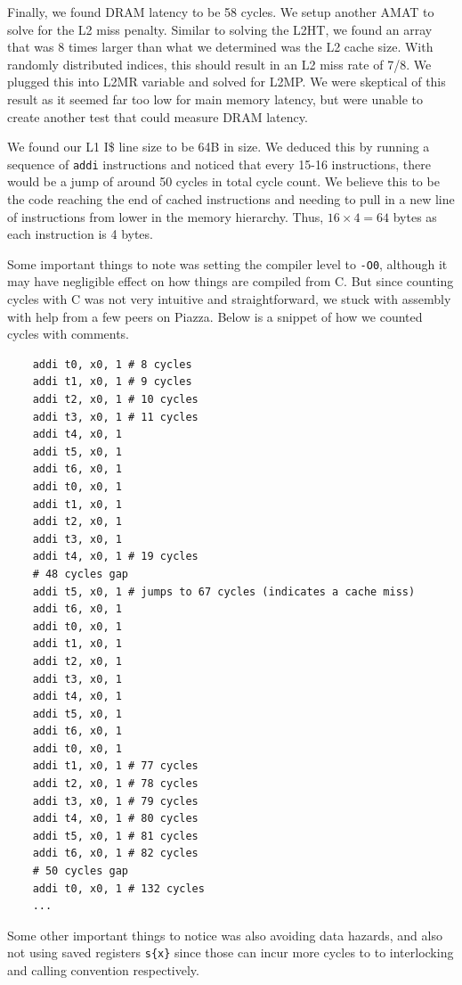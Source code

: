 \documentclass[11pt]{article}
\begin{document}
Finally, we found DRAM latency to be 58 cycles. We setup another AMAT to solve for the L2 miss penalty. Similar to solving the L2HT, we found an array that was 8 times larger than what we determined was the L2 cache size. With randomly distributed indices, this should result in an L2 miss rate of 7/8. We plugged this into L2MR variable and solved for L2MP. We were skeptical of this result as it seemed far too low for main memory latency, but were unable to create another test that could measure DRAM latency. \bigbreak

We found our L1 I\$ line size to be 64B in size. We deduced this by running a sequence of \texttt{addi} instructions and noticed that every 15-16 instructions, there would be a jump of around 50 cycles in total cycle count. We believe this to be the code reaching the end of cached instructions and needing to pull in a new line of instructions from lower in the memory hierarchy. Thus,  $16 \times 4 = 64$ bytes as each instruction is 4 bytes. \bigbreak

Some important things to note was setting the compiler level to \verb|-O0|, although it may have negligible effect on how things are compiled from C. But since counting cycles with C was not very intuitive and straightforward, we stuck with assembly with help from a few peers on Piazza. Below is a snippet of how we counted cycles with comments.

\begin{lstlisting}
    addi t0, x0, 1 # 8 cycles
    addi t1, x0, 1 # 9 cycles
    addi t2, x0, 1 # 10 cycles
    addi t3, x0, 1 # 11 cycles
    addi t4, x0, 1
    addi t5, x0, 1
    addi t6, x0, 1
    addi t0, x0, 1
    addi t1, x0, 1
    addi t2, x0, 1
    addi t3, x0, 1
    addi t4, x0, 1 # 19 cycles
    # 48 cycles gap
    addi t5, x0, 1 # jumps to 67 cycles (indicates a cache miss)
    addi t6, x0, 1
    addi t0, x0, 1
    addi t1, x0, 1
    addi t2, x0, 1
    addi t3, x0, 1
    addi t4, x0, 1
    addi t5, x0, 1
    addi t6, x0, 1
    addi t0, x0, 1
    addi t1, x0, 1 # 77 cycles
    addi t2, x0, 1 # 78 cycles
    addi t3, x0, 1 # 79 cycles
    addi t4, x0, 1 # 80 cycles
    addi t5, x0, 1 # 81 cycles
    addi t6, x0, 1 # 82 cycles
    # 50 cycles gap
    addi t0, x0, 1 # 132 cycles
    ...
\end{lstlisting}

Some other important things to notice was also avoiding data hazards, and also not using saved registers \verb|s{x}| since those can incur more cycles to to interlocking and calling convention respectively. \bigbreak
\end{document}
